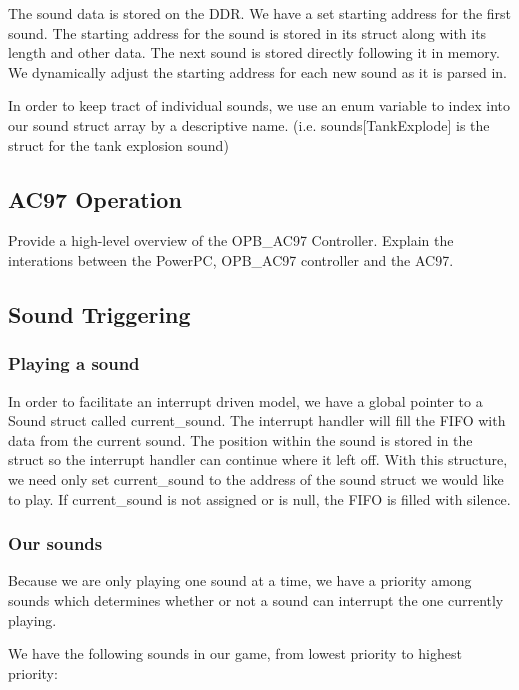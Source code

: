 \documentclass[11pt,letter,oneside]{report}
\begin{document}
The sound data is stored on the DDR.  We have a set starting address for the first sound.  The starting address for the sound is stored in its struct along with its length and other data.  The next sound is stored directly following it in memory.  We dynamically adjust the starting address for each new sound as it is parsed in.

In order to keep tract of individual sounds, we use an enum variable to index into our sound struct array by a descriptive name.  (i.e. sounds[TankExplode] is the struct for the tank explosion sound)

\subsection{AC97 Operation}

Provide a high-level overview of the OPB\_AC97 Controller. Explain the interations between the PowerPC, OPB\_AC97 controller and the AC97.

\subsection{Sound Triggering}

\subsubsection{Playing a sound}
In order to facilitate an interrupt driven model, we have a global pointer to a Sound struct  called current\_sound.  The interrupt handler will fill the FIFO with data from the current sound.  The position within the sound is stored in the struct so the interrupt handler can continue where it left off.  With this structure, we need only set current\_sound to the address of the sound struct we would like to play.  If current\_sound is not assigned or is null, the FIFO is filled with silence.

\subsubsection{Our sounds}

Because we are only playing one sound at a time, we have a priority among sounds which determines whether or not a sound can interrupt the one currently playing.

We have the following sounds in our game, from lowest priority to highest priority:
\end{document}
